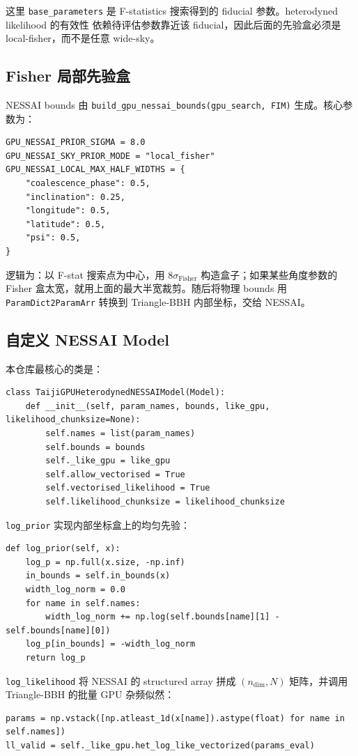 \documentclass[11pt,a4paper]{ctexart}
\begin{document}
这里 \texttt{base\_parameters} 是 F-statistics 搜索得到的 fiducial 参数。heterodyned likelihood 的有效性
依赖待评估参数靠近该 fiducial，因此后面的先验盒必须是 local-fisher，而不是任意 wide-sky。

\subsection{Fisher 局部先验盒}

NESSAI bounds 由 \texttt{build\_gpu\_nessai\_bounds(gpu\_search, FIM)} 生成。核心参数为：
\begin{lstlisting}[style=pycode]
GPU_NESSAI_PRIOR_SIGMA = 8.0
GPU_NESSAI_SKY_PRIOR_MODE = "local_fisher"
GPU_NESSAI_LOCAL_MAX_HALF_WIDTHS = {
    "coalescence_phase": 0.5,
    "inclination": 0.25,
    "longitude": 0.5,
    "latitude": 0.5,
    "psi": 0.5,
}
\end{lstlisting}

逻辑为：以 F-stat 搜索点为中心，用 \(8\sigma_\mathrm{Fisher}\) 构造盒子；如果某些角度参数的
Fisher 盒太宽，就用上面的最大半宽裁剪。随后将物理 bounds 用 \texttt{ParamDict2ParamArr} 转换到
Triangle-BBH 内部坐标，交给 NESSAI。

\subsection{自定义 NESSAI Model}

本仓库最核心的类是：
\begin{lstlisting}[style=pycode]
class TaijiGPUHeterodynedNESSAIModel(Model):
    def __init__(self, param_names, bounds, like_gpu, likelihood_chunksize=None):
        self.names = list(param_names)
        self.bounds = bounds
        self._like_gpu = like_gpu
        self.allow_vectorised = True
        self.vectorised_likelihood = True
        self.likelihood_chunksize = likelihood_chunksize
\end{lstlisting}

\texttt{log\_prior} 实现内部坐标盒上的均匀先验：
\begin{lstlisting}[style=pycode]
def log_prior(self, x):
    log_p = np.full(x.size, -np.inf)
    in_bounds = self.in_bounds(x)
    width_log_norm = 0.0
    for name in self.names:
        width_log_norm += np.log(self.bounds[name][1] - self.bounds[name][0])
    log_p[in_bounds] = -width_log_norm
    return log_p
\end{lstlisting}

\texttt{log\_likelihood} 将 NESSAI 的 structured array 拼成 \((n_\mathrm{dim},N)\) 矩阵，并调用
Triangle-BBH 的批量 GPU 杂频似然：
\begin{lstlisting}[style=pycode]
params = np.vstack([np.atleast_1d(x[name]).astype(float) for name in self.names])
ll_valid = self._like_gpu.het_log_like_vectorized(params_eval)
\end{lstlisting}
\end{document}
